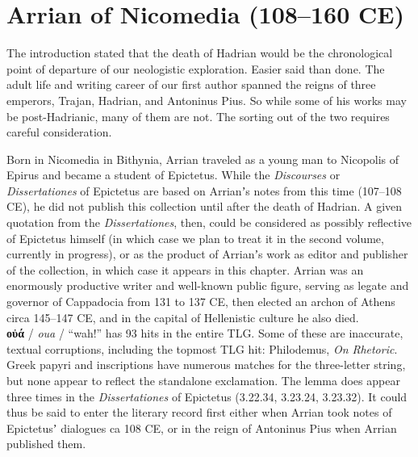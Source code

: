 %
%
\chapter{Arrian of Nicomedia (108--160 CE)}
\vspace*{3mm}%
\justifying%
%

\noindent{}The introduction stated that the death of Hadrian %
would be the chronological point of departure of our neologistic exploration. %
Easier said than done. %
The adult life and writing career of our first author spanned the reigns of three emperors, %
Trajan, Hadrian, and Antoninus Pius. %
So while some of his works may be post-Hadrianic, %
many of them are not. %
The sorting out of the two requires careful consideration. %

Born in Nicomedia in Bithynia, %
Arrian traveled as a young man to Nicopolis of Epirus %
and became a student of Epictetus. %
While the \textit{Discourses} or \textit{Dissertationes} of Epictetus %
are based on Arrianʼs notes from this time (107--108 CE), %
he did not publish this collection until after the death of Hadrian. %
A given quotation from the \textit{Dissertationes}, then, %
could be considered as possibly reflective of Epictetus himself %
(in which case we plan to treat it in the second volume, currently in progress), %
or as the product of Arrianʼs work as editor and publisher of the collection, %
in which case it appears in this chapter. %
Arrian was an enormously productive writer and well-known public figure, %
serving as legate and governor of Cappadocia from 131 to 137 CE, %
then elected an archon of Athens circa 145--147 CE, and in the capital of Hellenistic culture he also died. \\[1mm] %

\noindent{}\textbf{οὐά} / \textit{oua} / “wah!” has 93 hits in the entire TLG. %
Some of these are inaccurate, textual corruptions, %
including the topmost TLG hit: Philodemus, \textit{On Rhetoric}. %
Greek papyri and inscriptions have numerous matches for the three-letter string, %
but none appear to reflect the standalone exclamation. %
The lemma does appear three times in the \textit{Dissertationes} of %
Epictetus (3.22.34, 3.23.24, 3.23.32). %
It could thus be said to enter the literary record first either %
when Arrian took notes of Epictetusʼ dialogues ca 108 CE, %
or in the reign of Antoninus Pius when Arrian published them. %

